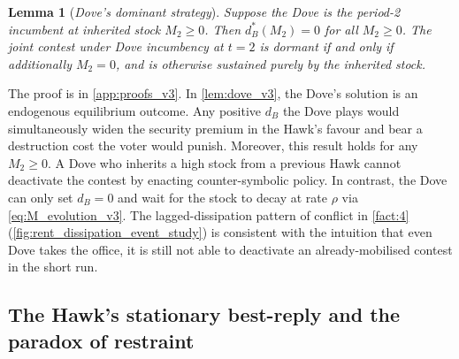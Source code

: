 \documentclass[11pt,twoside]{extarticle}
\newtheorem{lemma}{Lemma}
\begin{document}
\begin{lemma}[\emph{Dove's dominant strategy}]\label{lem:dove_v3}
Suppose the Dove is the period-2 incumbent at inherited stock $M_2\ge 0$. Then $d_B^*(M_2)=0$ for all $M_2\ge 0$. The joint contest under Dove incumbency at $t=2$ is dormant if and only if additionally $M_2=0$, and is otherwise sustained purely by the inherited stock.
\end{lemma}

The proof is in \autoref{app:proofs_v3}. In \autoref{lem:dove_v3}, the Dove's solution is an endogenous equilibrium outcome. Any positive $d_B$ the Dove plays would simultaneously widen the security premium in the Hawk's favour and bear a destruction cost the voter would punish. Moreover, this result holds for any $M_2\ge 0$. A Dove who inherits a high stock from a previous Hawk cannot deactivate the contest by enacting counter-symbolic policy. In contrast, the Dove can only set $d_B=0$ and wait for the stock to decay at rate $\rho$ via \eqref{eq:M_evolution_v3}. The lagged-dissipation pattern of conflict in \autoref{fact:4} (\autoref{fig:rent_dissipation_event_study}) is consistent with the intuition that even Dove takes the office, it is still not able to deactivate an already-mobilised contest in the short run. 

\subsection{The Hawk's stationary best-reply and the paradox of restraint}\label{subsec:hawk_t2_v3}
\end{document}
